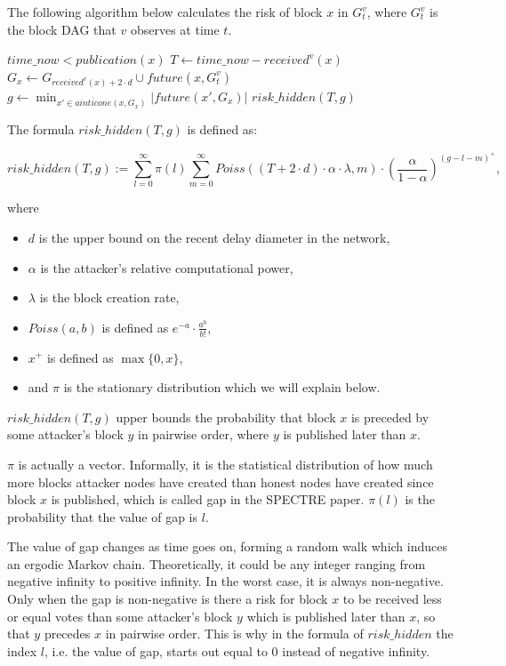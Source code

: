 \documentclass[a4paper,11pt]{article}
\begin{document}
The following algorithm below calculates the  risk of block $x$ in
$G_t^v$, where $G_t^v$ is the block DAG that $v$ observes at time $t$.

\begin{codebox}
\li \If $time\_now < publication(x)$
\li   \Then
      \End
\li $T \gets time\_now - received^v(x)$
\li $G_x \gets G_{received^v(x) + 2 \cdot d} \cup future(x, G_t^v)$
\li $g \gets \min_{x' \in \overline{ainticone}(x,G_x)} |future(x',G_x)|$
\li \Return $risk\_hidden(T,g)$
\end{codebox}

The formula $risk\_hidden(T,g)$ is defined as:

$$
risk\_hidden(T,g) := \sum_{l=0}^{\infty} \pi(l) \sum_{m=0}^{\infty} Poiss((T + 2
\cdot d) \cdot \alpha \cdot \lambda, m) \cdot \left(\frac{\alpha}{1 -
\alpha}\right)^{(g - l - m)^+},
$$

where

\begin{itemize}
	\item $d$ is the upper bound on the recent delay diameter in the network,
	\item $\alpha$ is the attacker’s relative computational power,
	\item $\lambda$ is the block creation rate,
	\item $Poiss(a, b)$ is defined as $e^{-a} \cdot \frac{a^b}{b!}$,
	\item $x^+$ is defined as $\max\{0, x\}$,
	\item and $\pi$ is the stationary distribution which we will explain below.
\end{itemize}

$risk\_hidden(T,g)$ upper bounds the probability that block $x$ is preceded by
some attacker’s block $y$ in pairwise order, where $y$ is published later than
$x$.

$\pi$ is actually a vector. Informally, it is the statistical distribution of
how much more blocks attacker nodes have created than honest nodes have created
since block $x$ is published, which is called gap in the SPECTRE paper. $\pi(l)$
is the probability that the value of gap is $l$.

The value of gap changes as time goes on, forming a random walk which induces an
ergodic Markov chain. Theoretically, it could be any integer ranging from
negative infinity to positive infinity. In the worst case, it is always
non-negative. Only when the gap is non-negative is there a risk for block $x$ to
be received less or equal votes than some attacker’s block $y$ which is
published later than $x$, so that $y$ precedes $x$ in pairwise order. This is
why in the formula of $risk\_hidden$ the index $l$, i.e. the value of gap,
starts out equal to 0 instead of negative infinity.
\end{document}
